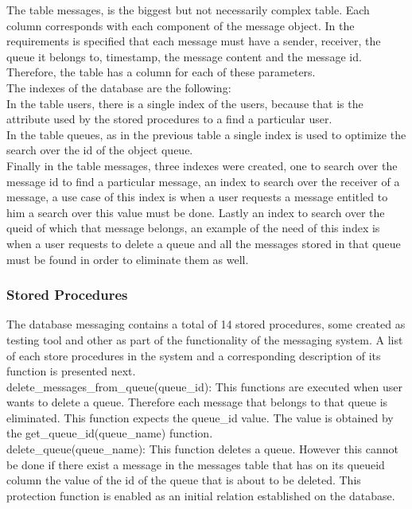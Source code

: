 The table messages, is the biggest but not necessarily complex table. Each column corresponds with each component of the message object. In the requirements is specified that each message must have a sender, receiver, the queue it belongs to, timestamp, the message content and the message id. Therefore, the table has a column for each of these parameters.\\

The indexes of the database are the following:\\
In the table users, there is a single index of the users, because that is the attribute used by the stored procedures to a find a particular user.\\
In the table queues, as in the previous table a single index is used to optimize the search over the id of the object queue.\\
Finally in the table messages, three indexes were created, one to search over the message id to find a particular message, an index to search over the receiver of a message, a use case of this index is when a user requests a message entitled to him a search over this value must be done. Lastly an index to search over the queid of which that message belongs, an example of the need of this index is when a user requests to delete a queue and all the messages stored in that queue must be found in order to eliminate them as well.


\subsubsection{Stored Procedures}\label{sec:stored-procedures}
The database messaging contains a total of 14 stored procedures, some created as testing tool and other as part of the functionality of the messaging system. A list of each store procedures in the system and a corresponding description of its function is presented next.\\

delete\_messages\_from\_queue(queue\_id): This functions are executed when user wants to delete a queue. Therefore each message that belongs to that queue is eliminated. This function expects the queue\_id value. The value is obtained by the get\_queue\_id(queue\_name) function.\\

delete\_queue(queue\_name): This function deletes a queue. However this cannot be done if there exist a message in the messages table that has on its queueid column the value of the id of the queue that is about to be deleted. This protection function is enabled as an initial relation established on the database.\\

